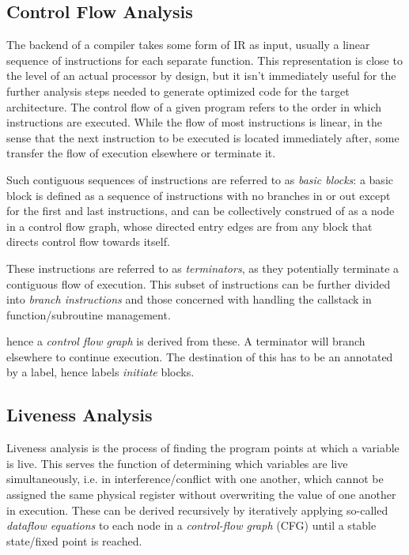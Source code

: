 \documentclass{article}
\begin{document}
\subsection{Control Flow Analysis}

The backend of a compiler takes some form of IR as input, usually a linear sequence of instructions for each separate function. This representation is close to the level of an actual processor by design, but it isn't immediately useful for the further analysis steps needed to generate optimized code for the target architecture. %
The control flow of a given program refers to the order in which instructions are executed. While the flow of most instructions is linear, in the sense that the next instruction to be executed is located immediately after, some transfer the flow of execution elsewhere or terminate it. %


Such contiguous sequences of instructions are referred to as \textit{basic blocks}: a basic block is defined as a sequence of instructions with no branches in or out except for the first and last instructions, and can be collectively construed of as a node in a control flow graph, whose directed entry edges are from any block that directs control flow towards itself.

These instructions are referred to as \textit{terminators}, as they potentially terminate a contiguous flow of execution. This subset of instructions can be further divided into \textit{branch instructions} and those concerned with handling the callstack in function/subroutine management.









hence a \textit{control flow graph} is derived from these. A terminator will branch elsewhere to continue execution. The destination of this has to be an annotated by a label, hence labels \textit{initiate} blocks.

\subsection{Liveness Analysis}

Liveness analysis is the process of finding the program points at which a variable is live. This serves the function of determining which variables are live simultaneously, i.e. in interference/conflict with one another, which cannot be assigned the same physical register without overwriting the value of one another in execution. These can be derived recursively by iteratively applying so-called \textit{dataflow equations} to each node in a \textit{control-flow graph} (CFG) until a stable state/fixed point is reached.
\end{document}
